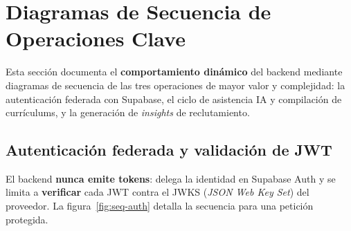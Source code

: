 \section{Diagramas de Secuencia de Operaciones Clave}
\label{sec:secuencias}

Esta sección documenta el \textbf{comportamiento dinámico} del backend mediante diagramas
de secuencia de las tres operaciones de mayor valor y complejidad: la autenticación
federada con Supabase, el ciclo de asistencia IA y compilación de currículums, y la
generación de \textit{insights} de reclutamiento.

\subsection{Autenticación federada y validación de JWT}
\label{subsec:seq_auth}

El backend \textbf{nunca emite tokens}: delega la identidad en Supabase Auth y se limita
a \textbf{verificar} cada JWT contra el JWKS (\textit{JSON Web Key Set}) del proveedor.
La figura~\ref{fig:seq-auth} detalla la secuencia para una petición protegida.

